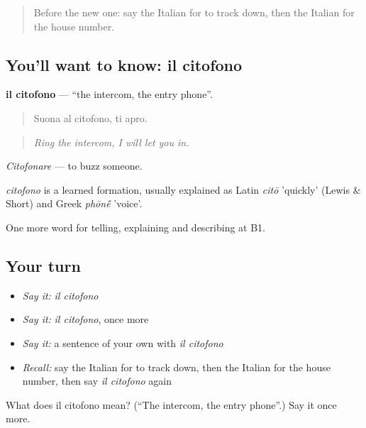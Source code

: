 \label{lesson:IT-C444-citofono}



\begin{quote}
Before the new one: say the Italian for to track down, then the Italian for the house number.
\end{quote}

\subsection*{You'll want to know: il citofono}
\textbf{il citofono} — \textquotedblleft{}the intercom, the entry phone\textquotedblright{}.

\begin{quote}
Suona al citofono, ti apro.
\end{quote}

\begin{quote}
\emph{Ring the intercom, I will let you in.}
\end{quote}

\emph{Citofonare} — to buzz someone.

\begin{cousinweb}
\emph{citofono} is a learned formation, usually explained as Latin \emph{citō} 'quickly' (Lewis \& Short) and Greek \emph{phōn\'{\={e}}} 'voice'.
\end{cousinweb}

\begin{grammarlens}[title={What you've built}]
One more word for telling, explaining and describing at B1.
\end{grammarlens}

\subsection*{Your turn}
\begin{itemize}
\raggedright
  \item \emph{Say it:} \emph{il citofono}
  \item \emph{Say it:} \emph{il citofono}, once more
  \item \emph{Say it:} a sentence of your own with \emph{il citofono}
  \item \emph{Recall:} say the Italian for to track down, then the Italian for the house number, then say \emph{il citofono} again
\end{itemize}

\begin{tcolorbox}[breakable,colback=teal!4,colframe=teal!35!black,title={Before you move on}]
What does il citofono mean? (\textquotedblleft{}The intercom, the entry phone\textquotedblright{}.) Say it once more.
\end{tcolorbox}
